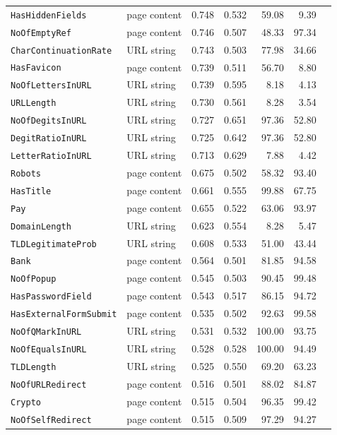 \begin{tabular}{@{}llrrrrc@{}}
\texttt{HasHiddenFields} & page content & 0.748 & 0.532 & 59.08 & 9.39 & \\
\texttt{NoOfEmptyRef} & page content & 0.746 & 0.507 & 48.33 & 97.34 & \\
\texttt{CharContinuationRate} & URL string & 0.743 & 0.503 & 77.98 & 34.66 & \\
\texttt{HasFavicon} & page content & 0.739 & 0.511 & 56.70 & 8.80 & \\
\texttt{NoOfLettersInURL} & URL string & 0.739 & 0.595 & 8.18 & 4.13 & \\
\texttt{URLLength} & URL string & 0.730 & 0.561 & 8.28 & 3.54 & \\
\texttt{NoOfDegitsInURL} & URL string & 0.727 & 0.651 & 97.36 & 52.80 & \\
\texttt{DegitRatioInURL} & URL string & 0.725 & 0.642 & 97.36 & 52.80 & \\
\texttt{LetterRatioInURL} & URL string & 0.713 & 0.629 & 7.88 & 4.42 & \\
\texttt{Robots} & page content & 0.675 & 0.502 & 58.32 & 93.40 & \\
\texttt{HasTitle} & page content & 0.661 & 0.555 & 99.88 & 67.75 & \\
\texttt{Pay} & page content & 0.655 & 0.522 & 63.06 & 93.97 & \\
\texttt{DomainLength} & URL string & 0.623 & 0.554 & 8.28 & 5.47 & \\
\texttt{TLDLegitimateProb} & URL string & 0.608 & 0.533 & 51.00 & 43.44 & \\
\texttt{Bank} & page content & 0.564 & 0.501 & 81.85 & 94.58 & \\
\texttt{NoOfPopup} & page content & 0.545 & 0.503 & 90.45 & 99.48 & \\
\texttt{HasPasswordField} & page content & 0.543 & 0.517 & 86.15 & 94.72 & \\
\texttt{HasExternalFormSubmit} & page content & 0.535 & 0.502 & 92.63 & 99.58 & \\
\texttt{NoOfQMarkInURL} & URL string & 0.531 & 0.532 & 100.00 & 93.75 & \\
\texttt{NoOfEqualsInURL} & URL string & 0.528 & 0.528 & 100.00 & 94.49 & \\
\texttt{TLDLength} & URL string & 0.525 & 0.550 & 69.20 & 63.23 & \\
\texttt{NoOfURLRedirect} & page content & 0.516 & 0.501 & 88.02 & 84.87 & \\
\texttt{Crypto} & page content & 0.515 & 0.504 & 96.35 & 99.42 & \\
\texttt{NoOfSelfRedirect} & page content & 0.515 & 0.509 & 97.29 & 94.27 & \\

\end{tabular}
